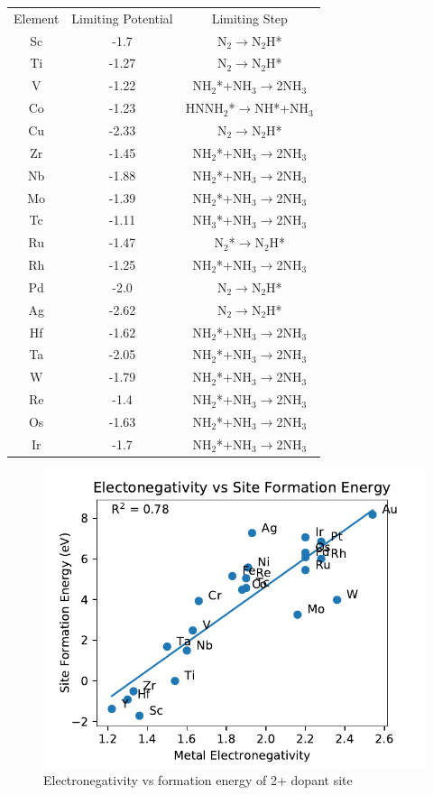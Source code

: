 \begin{table}[]
\begin{center}
\begin{tabular}{| c | c |c |}
\hline
Element & Limiting Potential & Limiting Step \\
Sc & -1.7 & N$_2$$\rightarrow$N$_2$H*\\
Ti & -1.27 & N$_2$$\rightarrow$N$_2$H*\\
V & -1.22 & NH$_2$*+NH$_3$$\rightarrow$2NH$_3$\\
Co & -1.23 & HNNH$_2$*$\rightarrow$NH*+NH$_3$\\
Cu & -2.33 & N$_2$$\rightarrow$N$_2$H*\\
Zr & -1.45 & NH$_2$*+NH$_3$$\rightarrow$2NH$_3$\\
Nb & -1.88 & NH$_2$*+NH$_3$$\rightarrow$2NH$_3$\\
Mo & -1.39 & NH$_2$*+NH$_3$$\rightarrow$2NH$_3$\\
Tc & -1.11 & NH$_3$*+NH$_3$$\rightarrow$2NH$_3$\\
Ru & -1.47 & N$_2$*$\rightarrow$N$_2$H*\\
Rh & -1.25 & NH$_2$*+NH$_3$$\rightarrow$2NH$_3$\\
Pd & -2.0 & N$_2$$\rightarrow$N$_2$H*\\
Ag & -2.62 & N$_2$$\rightarrow$N$_2$H*\\
Hf & -1.62 & NH$_2$*+NH$_3$$\rightarrow$2NH$_3$\\
Ta & -2.05 & NH$_2$*+NH$_3$$\rightarrow$2NH$_3$\\
W & -1.79 & NH$_2$*+NH$_3$$\rightarrow$2NH$_3$\\
Re & -1.4 & NH$_2$*+NH$_3$$\rightarrow$2NH$_3$\\
Os & -1.63 & NH$_2$*+NH$_3$$\rightarrow$2NH$_3$\\
Ir & -1.7 & NH$_2$*+NH$_3$$\rightarrow$2NH$_3$\\

\end{tabular}
\end{center}
\end{table}


\begin{figure}
\centering
\includegraphics[width=0.8\linewidth]{Images/electronegativity_vs_formation.pdf}
\caption{Electronegativity vs formation energy of 2+ dopant site}
\end{figure}

